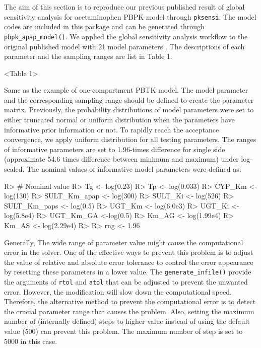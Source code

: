 \documentclass[article]{jss}
\begin{document}
The aim of this section is to reproduce our previous published
\citep{fphar201800588} result of global sensitivity analysis for
acetaminophen PBPK model through \texttt{pksensi}. The model codes are
included in this package and can be generated through
\texttt{pbpk\_apap\_model()}. We applied the global sensitivity analysis
workflow to the original published model with 21 model parameters
\citep{s13318-015-0253-x}. The descriptions of each parameter and the
sampling ranges are list in Table 1.

\textless{}Table 1\textgreater{}

Same as the example of one-compartment PBTK model. The model parameter
and the corresponding sampling range should be defined to create the
parameter matrix. Previously, the probability distributions of model
parameters were set to either truncated normal or uniform distribution
when the parameters have informative prior information or not. To
rapidly reach the acceptance convergence, we apply uniform distribution
for all testing parameters. The ranges of informative parameters are set
to 1.96-times difference for single side (approximate 54.6 times
difference between minimum and maximum) under log-scaled. The nominal
values of informative model parameters were defined as:

\begin{CodeChunk}

\begin{CodeInput}
R> # Nominal value
R> Tg <- log(0.23)
R> Tp <- log(0.033)
R> CYP_Km <- log(130)
R> SULT_Km_apap <- log(300)
R> SULT_Ki <- log(526)
R> SULT_Km_paps <- log(0.5)
R> UGT_Km <- log(6.0e3)
R> UGT_Ki <- log(5.8e4)
R> UGT_Km_GA <-log(0.5)
R> Km_AG <- log(1.99e4)
R> Km_AS <- log(2.29e4)
R> 
R> rng <- 1.96 
\end{CodeInput}
\end{CodeChunk}

Generally, The wide range of parameter value might cause the
computational error in the solver. One of the effective ways to prevent
this problem is to adjust the value of relative and absolute error
tolerance to control the error appearance by resetting these parameters
in a lower value. The \texttt{generate\_infile()} provide the arguments
of \texttt{rtol} and \texttt{atol} that can be adjusted to prevent the
unwanted error. However, the modification will slow down the
computational speed. Therefore, the alternative method to prevent the
computational error is to detect the crucial parameter range that causes
the problem. Also, setting the maximum number of (internally defined)
steps to higher value instead of using the default value (500) can
prevent this problem. The maximum number of step is set to 5000 in this
case.
\end{document}
